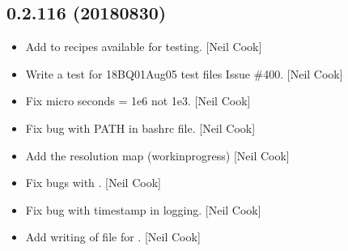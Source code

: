 \documentclass[a4paper,10pt,english]{report}
\begin{document}
\subsection{0.2.116 (2018\sphinxhyphen{}08\sphinxhyphen{}30)}
\label{\detokenize{misc/changelog:id364}}\begin{itemize}
\item {} 
Add  to recipes available for testing. {[}Neil
Cook{]}

\item {} 
Write a test for 18BQ01\sphinxhyphen{}Aug05 test files  \sphinxhyphen{} Issue
\#400. {[}Neil Cook{]}

\item {} 
Fix micro seconds = 1e\sphinxhyphen{}6 not 1e\sphinxhyphen{}3. {[}Neil Cook{]}

\item {} 
Fix bug with PATH in bashrc file. {[}Neil Cook{]}

\item {} 
Add the resolution map (work\sphinxhyphen{}in\sphinxhyphen{}progress) {[}Neil Cook{]}

\item {} 
Fix bugs with . {[}Neil Cook{]}

\item {} 
Fix bug with timestamp in logging. {[}Neil Cook{]}

\item {} 
Add writing of file for . {[}Neil Cook{]}

\end{itemize}
\end{document}
